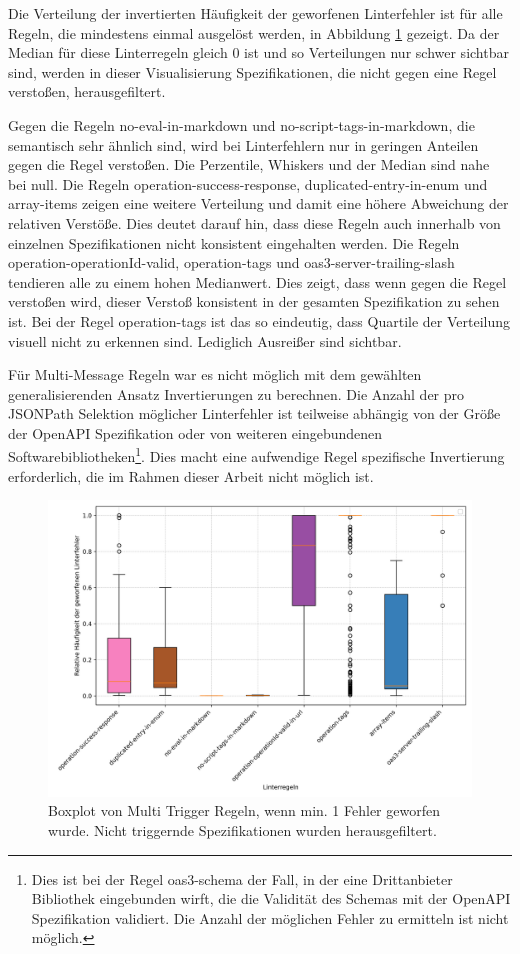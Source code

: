 Die Verteilung der invertierten Häufigkeit der geworfenen Linterfehler ist für alle Regeln, die mindestens einmal ausgelöst werden, in Abbildung \ref{fig:boxplotcleanmultitrigger} gezeigt. Da der Median für diese Linterregeln gleich 0 ist und so Verteilungen nur schwer sichtbar sind, werden in dieser Visualisierung Spezifikationen, die nicht gegen eine Regel verstoßen, herausgefiltert.

Gegen die Regeln no-eval-in-markdown und no-script-tags-in-markdown, die semantisch sehr ähnlich sind, wird bei Linterfehlern nur in geringen Anteilen gegen die Regel verstoßen. Die Perzentile, Whiskers und der Median sind nahe bei null. Die Regeln operation-success-response, duplicated-entry-in-enum und array-items zeigen eine weitere Verteilung und damit eine höhere Abweichung der relativen Verstöße. Dies deutet darauf hin, dass diese Regeln auch innerhalb von einzelnen Spezifikationen nicht konsistent eingehalten werden. Die Regeln operation-operationId-valid, operation-tags und oas3-server-trailing-slash tendieren alle zu einem hohen Medianwert. Dies zeigt, dass wenn gegen die Regel verstoßen wird, dieser Verstoß konsistent in der gesamten Spezifikation zu sehen ist. Bei der Regel operation-tags ist das so eindeutig, dass Quartile der Verteilung visuell nicht zu erkennen sind. Lediglich Ausreißer sind sichtbar.

Für Multi-Message Regeln war es nicht möglich mit dem gewählten generalisierenden Ansatz Invertierungen zu berechnen. Die Anzahl der pro JSONPath Selektion möglicher Linterfehler ist teilweise abhängig von der Größe der OpenAPI Spezifikation oder von weiteren eingebundenen Softwarebibliotheken\footnote{Dies ist bei der Regel oas3-schema der Fall, in der eine Drittanbieter Bibliothek eingebunden wirft, die die Validität des Schemas mit der OpenAPI Spezifikation validiert. Die Anzahl der möglichen Fehler zu ermitteln ist nicht möglich.}. Dies macht eine aufwendige Regel spezifische Invertierung erforderlich, die im Rahmen dieser Arbeit nicht möglich ist.

\begin{figure}[htbp]
  \centering
  \includegraphics[width=1\linewidth]{img/boxplotcleanmultitrigger.png}
  \caption{Boxplot von Multi Trigger Regeln, wenn min. 1 Fehler geworfen wurde. Nicht triggernde Spezifikationen wurden  herausgefiltert.}
  \label{fig:boxplotcleanmultitrigger}
\end{figure}


